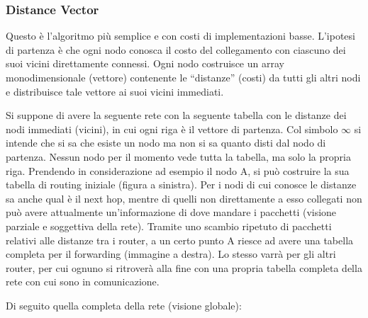 \subsubsection{Distance Vector}
Questo è l’algoritmo più semplice e con costi di implementazioni basse. L’ipotesi di partenza è che ogni nodo conosca il costo del collegamento con ciascuno dei suoi vicini direttamente connessi. Ogni nodo costruisce un array monodimensionale (vettore) contenente le “distanze” (costi) da tutti gli altri nodi e distribuisce tale vettore ai suoi vicini immediati.
\begin{example}
Si suppone di avere la seguente rete con la seguente tabella con le distanze dei nodi immediati (vicini), in cui ogni riga è il vettore di partenza. Col simbolo $\infty$ si intende che si sa che esiste un nodo ma non si sa quanto disti dal nodo di partenza. Nessun nodo per il momento vede tutta la tabella, ma solo la propria riga. Prendendo in considerazione ad esempio il nodo A, si può costruire la sua tabella di routing iniziale (figura a sinistra). Per i nodi di cui conosce le distanze sa anche qual è il next hop, mentre di quelli non direttamente a esso collegati non può avere attualmente un’informazione di dove mandare i pacchetti (visione parziale e soggettiva della rete). Tramite uno scambio ripetuto di pacchetti relativi alle distanze tra i router, a un certo punto A riesce ad avere una tabella completa per il forwarding (immagine a destra). Lo stesso varrà per gli altri router, per cui ognuno si ritroverà alla fine con una propria tabella completa della rete con cui sono in comunicazione.
\end{example}
Di seguito quella completa della rete (visione globale):
